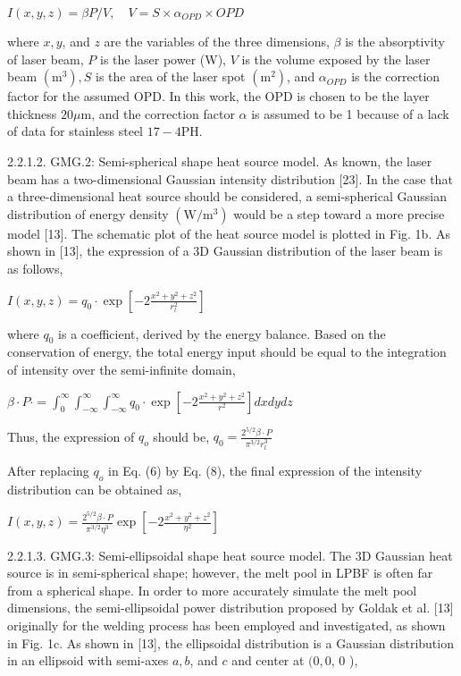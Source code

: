 \documentclass[10pt]{article}
\begin{document}
$I(x, y, z)=\beta P / V, \quad V=S \times \alpha_{O P D} \times O P D$

where $x, y$, and $z$ are the variables of the three dimensions, $\beta$ is the absorptivity of laser beam, $P$ is the laser power (W), $V$ is the volume exposed by the laser beam $\left(\mathrm{m}^{3}\right), S$ is the area of the laser spot $\left(\mathrm{m}^{2}\right)$, and $\alpha_{O P D}$ is the correction factor for the assumed OPD. In this work, the OPD is chosen to be the layer thickness $20 \mu \mathrm{m}$, and the correction factor $\alpha$ is assumed to be 1 because of a lack of data for stainless steel $17-4 \mathrm{PH}$.

2.2.1.2. GMG.2: Semi-spherical shape heat source model. As known, the laser beam has a two-dimensional Gaussian intensity distribution [23]. In the case that a three-dimensional heat source should be considered, a semi-spherical Gaussian distribution of energy density $\left(\mathrm{W} / \mathrm{m}^{3}\right)$ would be a step toward a more precise model [13]. The schematic plot of the heat source model is plotted in Fig. 1b. As shown in [13], the expression of a 3D Gaussian distribution of the laser beam is as follows,

$I(x, y, z)=q_{0} \cdot \exp \left[-2 \frac{x^{2}+y^{2}+z^{2}}{r_{l}^{2}}\right]$

where $q_{0}$ is a coefficient, derived by the energy balance. Based on the conservation of energy, the total energy input should be equal to the integration of intensity over the semi-infinite domain,

$\beta \cdot P \cdot=\int_{0}^{\infty} \int_{-\infty}^{\infty} \int_{-\infty}^{\infty} q_{0} \cdot \exp \left[-2 \frac{x^{2}+y^{2}+z^{2}}{r^{2}}\right] d x d y d z$

Thus, the expression of $q_{o}$ should be, $q_{0}=\frac{2^{5 / 2} \beta \cdot P}{\pi^{3 / 2} r_{l}^{3}}$

After replacing $q_{o}$ in Eq. (6) by Eq. (8), the final expression of the intensity distribution can be obtained as,

$I(x, y, z)=\frac{2^{5 / 2} \beta \cdot P}{\pi^{3 / 2} \eta^{3}} \exp \left[-2 \frac{x^{2}+y^{2}+z^{2}}{\eta^{2}}\right]$

2.2.1.3. GMG.3: Semi-ellipsoidal shape heat source model. The 3D Gaussian heat source is in semi-spherical shape; however, the melt pool in LPBF is often far from a spherical shape. In order to more accurately simulate the melt pool dimensions, the semi-ellipsoidal power distribution proposed by Goldak et al. [13] originally for the welding process has been employed and investigated, as shown in Fig. 1c. As shown in [13], the ellipsoidal distribution is a Gaussian distribution in an ellipsoid with semi-axes $a, b$, and $c$ and center at $(0,0$, 0 ),
\end{document}

